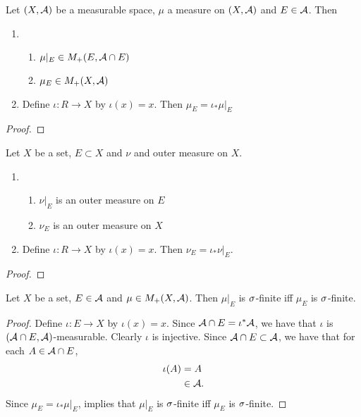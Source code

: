 \documentclass{book}
\begin{document}

	\begin{ex}  
		Let $(X, \mathcal{A})$ be a measurable space, $\mu$ a measure on $(X, \mathcal{A})$ and $E \in \mathcal{A}$. Then 
		\begin{enumerate}
			\item \begin{enumerate}
				\item $\mu|_E \in M_+(E, \mathcal{A} \cap E)$
				\item $\mu_E \in M_+(X, \mathcal{A})$
			\end{enumerate}
			\item Define $\iota:R \rightarrow X$ by $\iota(x) = x$. Then $\mu_E = \iota_*\mu|_E$
		\end{enumerate} 
	\end{ex}

	\begin{proof}
	\end{proof}

	\begin{ex}  
		Let $X$ be a set, $E \subset X$ and $\nu$ and outer measure on $X$. 
		\begin{enumerate}
			\item \begin{enumerate}
				\item $\nu|_E$ is an outer measure on $E$
				\item $\nu_E$ is an outer measure on $X$
			\end{enumerate}
			\item Define $\iota:R \rightarrow X$ by $\iota(x) = x$. Then $\nu_E = \iota_*\nu|_E$.
		\end{enumerate}
		
	\end{ex}

	\begin{proof}
	\end{proof}

	\begin{ex}  
		Let $X$ be a set, $E \in \mathcal{A}$ and $\mu \in M_+(X, \mathcal{A})$. Then $\mu|_E$ is $\sigma$-finite iff $\mu_E$ is $\sigma$-finite.
	\end{ex}

	\begin{proof} 
		Define $\iota:E \rightarrow X$ by $\iota(x) = x$. Since $\mathcal{A} \cap E = \iota^*\mathcal{A}$, we have that $\iota$ is $(\mathcal{A} \cap E, \mathcal{A})$-measurable. Clearly $\iota$ is injective. Since $\mathcal{A} \cap E \subset \mathcal{A}$, we have that for each $A \in \mathcal{A} \cap E$,  
		\begin{align*}
			\iota(A) 
			& = A \\
			& \in \mathcal{A}.
		\end{align*}
		Since $\mu_E = \iota_* \mu|_E$,  implies that $\mu|_E$ is $\sigma$-finite iff $\mu_E$ is $\sigma$-finite.
	\end{proof}
\end{document}
